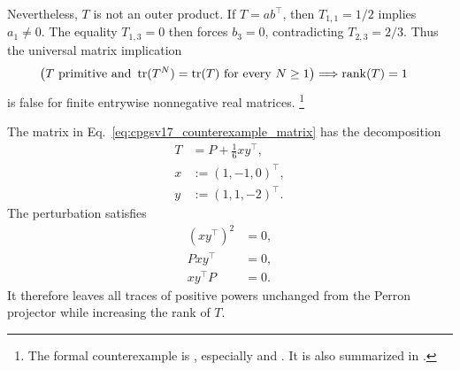 \documentclass{article}
\begin{document}
Nevertheless, $T$ is not an outer product. If $T=ab^{\top}$, then
$T_{1,1}=1/2$ implies $a_1\neq 0$. The equality $T_{1,3}=0$ then forces
$b_3=0$, contradicting $T_{2,3}=2/3$. Thus the universal matrix implication
\begin{align}
    \left(T\ \text{primitive and }
        \operatorname{tr}(T^N)=\operatorname{tr}(T)\ \text{for every }N\geq 1\right)
        &\Longrightarrow \operatorname{rank}(T)=1
    \label{eq:cpgsv17_false_matrix_implication}
\end{align}
is false for finite entrywise nonnegative real matrices.
\footnote{The formal counterexample is
, especially
 and
. It is also summarized in
.}

The matrix in Eq.~\ref{eq:cpgsv17_counterexample_matrix} has the decomposition
\begin{align}
    T
        &= P+\frac16xy^{\top},
    \label{eq:cpgsv17_nilpotent_perturbation}\\
    x
        &:= (1,-1,0)^{\top},
    \label{eq:cpgsv17_nilpotent_left_vector}\\
    y
        &:= (1,1,-2)^{\top}.
    \label{eq:cpgsv17_nilpotent_right_vector}
\end{align}
The perturbation satisfies
\begin{align}
    (xy^{\top})^2
        &= 0,
    \label{eq:cpgsv17_perturbation_nilpotent}\\
    Pxy^{\top}
        &= 0,
    \label{eq:cpgsv17_perturbation_left_annihilation}\\
    xy^{\top}P
        &= 0.
    \label{eq:cpgsv17_perturbation_right_annihilation}
\end{align}
It therefore leaves all traces of positive powers unchanged from the Perron
projector while increasing the rank of $T$.
\end{document}
